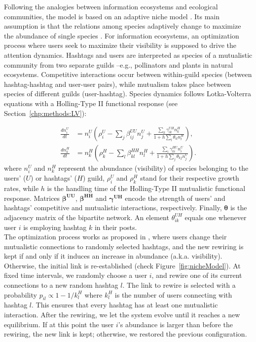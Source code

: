 Following the analogies between information ecosystems \cite{palazzi2021ecological,plata2021neutral} and ecological communities, the model is based on an adaptive niche model \cite{cai2021niches}. Its main assumption is that the relations among species adaptively change to maximize the abundance of single species \cite{suweis2013emergence}. For information ecosystems, an optimization process where users seek to maximize their visibility is supposed to drive the attention dynamics. Hashtags and users are interpreted as species of a mutualistic community from two separate guilds --e.g., pollinators and plants in natural ecosystems. Competitive interactions occur between within-guild species (between hashtag-hashtag and user-user pairs), while mutualism takes place between species of different guilds (user-hashtag). Species dynamics follows Lotka-Volterra equations with a Holling-Type II functional response (see Section~\ref{chp:methods:LV}): 

\begin{equation}
\label{eq:dyn}
{\begin{aligned}{\frac {dn_i^U}{dt}}&=n_i^U \left(\rho_i^U - \sum_j \beta_{ij}^{UU}n_j^U + \frac{\sum_k \gamma_{ik}^{UH}n_k^H }{1+ h \sum_l \theta_{il}n_l^H} \right), \\[6pt]
{\frac {dn_k^H}{dt}}&=n_k^H \left(\rho_k^H - \sum_l \beta_{kl}^{HH}n_l^H + \frac{\sum_i \gamma_{ki}^{HU}n_i^U }{1+ h \sum_j \theta_{kj}n_j^U} \right).
\end{aligned}}
\end{equation}
where $n_i^U$ and $n_k^H$ represent the abundance (visibility) of species belonging to the users' ($U$)  or hashtags' ($H$) guild, $\rho_i^U$ and $\rho_k^H$ stand for their respective growth rates, while  $h$ is the handling time of the Holling-Type II mutualistic functional response. Matrices $\boldsymbol{\beta^{UU}}$, $\boldsymbol{\beta^{HH}}$ and $\boldsymbol{\gamma^{UH}}$ encode the strength of users' and hashtags' competitive and mutualistic interactions, respectively. Finally, $\boldsymbol{\theta}$ is the adjacency matrix of the bipartite network. An element $\theta_{ik}^{UH}$ equals one whenever user $i$ is employing hashtag $k$ in their posts. \\

The optimization process works as proposed in \cite{suweis2013emergence}, where users change their mutualistic connections to randomly selected hashtags, and the new rewiring is kept if and only if it induces an increase in abundance (a.k.a. visibility). Otherwise, the initial link is re-established (check Figure~\ref{fig:nicheModel}). At fixed time intervals, we randomly choose a user $i$, and rewire one of its current connections to a new random hashtag $l$. The link to rewire is selected with a probability $p_{il} \propto 1 - 1/k^{H}_{l}$ where $k^{H}_{l}$ is the  number of users connecting with hashtag $l$. This ensures that every hashtag has at least one mutualistic interaction. After the rewiring, we let the system evolve until it reaches a new equilibrium. If at this point the user $i$'s abundance is larger than before the rewiring, the new link is kept; otherwise, we restored the previous configuration.   \\

